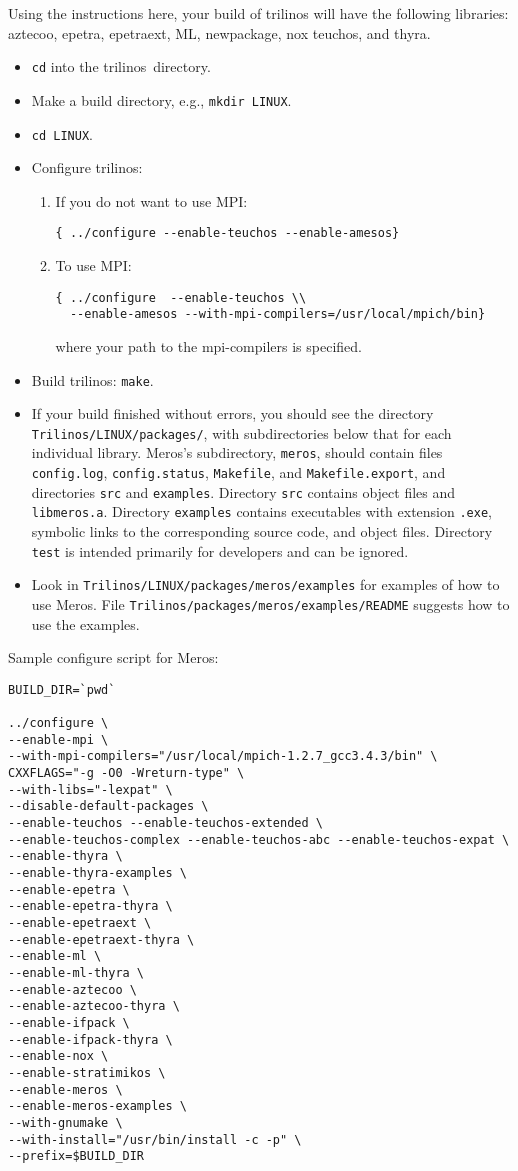 Using the instructions here, your build of trilinos will have the following
libraries: aztecoo, epetra, epetraext, ML, newpackage,
nox teuchos, and thyra.
\begin{itemize}
\item \verb!cd! into the trilinos~directory.
\item Make a build directory, e.g., \verb!mkdir LINUX!.
\item \verb!cd LINUX!.
\item Configure trilinos:
  \begin{enumerate}
  \item   If you do not want to use MPI:
\begin{verbatim} 
{ ../configure --enable-teuchos --enable-amesos} 
\end{verbatim}
  \item To use MPI:
\begin{verbatim} 
{ ../configure  --enable-teuchos \\
  --enable-amesos --with-mpi-compilers=/usr/local/mpich/bin} 
\end{verbatim}
where your path to the mpi-compilers is specified.
  \end{enumerate}

\item Build trilinos: \verb!make!.
\item If your build finished without errors, you should see the directory\\
\verb!Trilinos/LINUX/packages/!, with subdirectories below that for
each individual library.   Meros's subdirectory, \verb!meros!, should contain
files \verb!config.log!, \verb!config.status!, \verb!Makefile!, and
\verb!Makefile.export!, and directories \verb!src! and \verb!examples!.
Directory \verb!src! contains object files and \verb!libmeros.a!.
Directory \verb!examples! contains executables with extension \verb!.exe!,
symbolic links to the corresponding source code, and object files.
Directory \verb!test! is intended primarily for developers and can be ignored.
\item Look in \verb!Trilinos/LINUX/packages/meros/examples! for
examples of how to use Meros. File
\verb!Trilinos/packages/meros/examples/README! suggests how to use the
examples.
\end{itemize}


Sample configure script for Meros:

\begin{verbatim}
BUILD_DIR=`pwd`

../configure \
--enable-mpi \
--with-mpi-compilers="/usr/local/mpich-1.2.7_gcc3.4.3/bin" \
CXXFLAGS="-g -O0 -Wreturn-type" \
--with-libs="-lexpat" \
--disable-default-packages \
--enable-teuchos --enable-teuchos-extended \
--enable-teuchos-complex --enable-teuchos-abc --enable-teuchos-expat \
--enable-thyra \
--enable-thyra-examples \
--enable-epetra \
--enable-epetra-thyra \
--enable-epetraext \
--enable-epetraext-thyra \
--enable-ml \
--enable-ml-thyra \
--enable-aztecoo \
--enable-aztecoo-thyra \
--enable-ifpack \
--enable-ifpack-thyra \
--enable-nox \
--enable-stratimikos \
--enable-meros \
--enable-meros-examples \
--with-gnumake \
--with-install="/usr/bin/install -c -p" \
--prefix=$BUILD_DIR
\end{verbatim}

